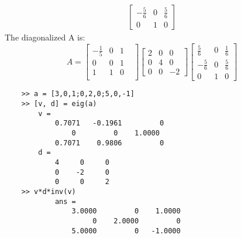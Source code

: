 \begin{example}
\begin{align*}
\begin{bmatrix}
            - \frac{5}{6} & 0 & \frac{5}{6} \\
            0             & 1 & 0
        \end{bmatrix}
    \end{align*}
    The diagonalized A is:
    \begin{equation*}
        A = \begin{bmatrix}
            -\frac{1}{5} & 0 & 1   \\
            0            & 0 & 1 & \\
            1            & 1 & 0   \\
        \end{bmatrix} \begin{bmatrix}
            2 & 0 & 0 \\ 0 & 4 & 0 \\ 0 & 0 & -2
        \end{bmatrix}
        \begin{bmatrix}
            \frac{5}{6}   & 0 & \frac{1}{6} \\
            - \frac{5}{6} & 0 & \frac{5}{6} \\
            0             & 1 & 0
        \end{bmatrix}     \end{equation*}
    \begin{matlab}
        \begin{lstlisting}
    >> a = [3,0,1;0,2,0;5,0,-1]
    >> [v, d] = eig(a)
        v =
            0.7071   -0.1961         0
                0         0    1.0000
            0.7071    0.9806         0
        d =
            4     0     0
            0    -2     0
            0     0     2
    >> v*d*inv(v)
            ans =
                3.0000         0    1.0000
                     0    2.0000         0
                5.0000         0   -1.0000
            

   \end{lstlisting}
    \end{matlab}

\end{example}
